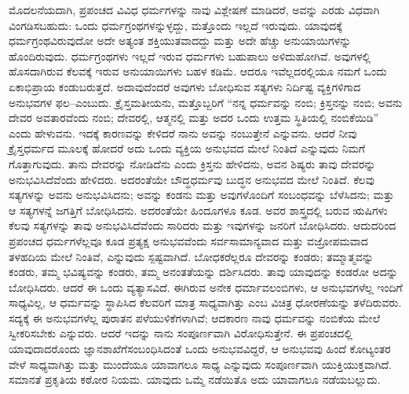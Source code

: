 \vskip 0.5cm

ಮೊದಲನೆಯದಾಗಿ, ಪ್ರಪಂಚದ ವಿವಿಧ ಧರ್ಮಗಳನ್ನು ನಾವು ವಿಶ್ಲೇಷಣೆ ಮಾಡಿದರೆ, ಅವನ್ನು ಎರಡು ವಿಧವಾಗಿ ವಿಂಗಡಿಸಬಹುದು: ಒಂದು ಧರ್ಮಗ್ರಂಥಗಳನ್ನುಳ್ಳದ್ದು, ಮತ್ತೊಂದು ಇಲ್ಲದೆ ಇರುವುದು. ಯಾವುದಕ್ಕೆ ಧರ್ಮಗ್ರಂಥವಿರುವುದೋ ಅದೇ ಅತ್ಯಂತ ಶಕ್ತಿಯುತವಾದದ್ದು ಮತ್ತು ಅದೇ ಹೆಚ್ಚು ಅನುಯಾಯಿಗಳನ್ನು ಹೊಂದಿರುವುದು. ಧರ್ಮಗ್ರಂಥಗಳು ಇಲ್ಲದೆ ಇರುವ ಧರ್ಮಗಳು ಬಹುಪಾಲು ಅಳಿದುಹೋಗಿವೆ. ಅವುಗಳಲ್ಲಿ ಹೊಸದಾಗಿರುವ ಕೆಲವಕ್ಕೆ ಇರುವ ಅನುಯಾಯಿಗಳು ಬಹಳ ಕಡಿಮೆ. ಆದರೂ ಇವೆಲ್ಲದರಲ್ಲಿಯೂ ನಮಗೆ ಒಂದು ಏಕಾಭಿಪ್ರಾಯ ಕಂಡುಬರುತ್ತದೆ. ಅದಾವುದೆಂದರೆ ಅವುಗಳು ಬೋಧಿಸುವ ಸತ್ಯಗಳು ನಿರ್ದಿಷ್ಟ ವ್ಯಕ್ತಿಗಳಿಗಾದ ಅನುಭವಗಳ ಫಲ–ಎಂಬುದು. ಕ್ರೈಸ್ತಮತೀಯನು, ಮತ್ತೊಬ್ಬರಿಗೆ “ನನ್ನ ಧರ್ಮವನ್ನು ನಂಬಿ; ಕ್ರಿಸ್ತನನ್ನು ನಂಬಿ; ಅವನು ದೇವರ ಅವತಾರವೆಂದು ನಂಬಿ; ದೇವರಲ್ಲಿ, ಆತ್ಮನಲ್ಲಿ ಮತ್ತು ಅದರ ಒಂದು ಉತ್ತಮ ಸ್ಥಿತಿಯಲ್ಲಿ ನಂಬಿಕೆಯಿಡಿ” ಎಂದು ಹೇಳುವನು. ಇದಕ್ಕೆ ಕಾರಣವನ್ನು ಕೇಳಿದರೆ ನಾನು ಅವನ್ನು ನಂಬುತ್ತೇನೆ ಎನ್ನುವನು. ಆದರೆ ನೀವು ಕ್ರೈಸ್ತಧರ್ಮದ ಮೂಲಕ್ಕೆ ಹೋದರೆ ಅದು ಒಂದು ವ್ಯಕ್ತಿಯ ಅನುಭವದ ಮೇಲೆ ನಿಂತಿದೆ ಎನ್ನುವುದು ನಿಮಗೆ ಗೊತ್ತಾಗುವುದು. ತಾನು ದೇವರನ್ನು ನೋಡಿದೆನು ಎಂದು ಕ್ರಿಸ್ತನು ಹೇಳಿದನು, ಅವನ ಶಿಷ್ಯರು ತಾವು ದೇವರನ್ನು ಅನುಭವಿಸಿದೆವೆಂದು ಹೇಳಿದರು. ಅದರಂತೆಯೇ ಬೌದ್ಧಧರ್ಮವು ಬುದ್ಧನ ಅನುಭವದ ಮೇಲೆ ನಿಂತಿದೆ. ಕೆಲವು ಸತ್ಯಗಳನ್ನು ಅವನು ಅನುಭವಿಸಿದನು; ಅವನ್ನು ಕಂಡನು ಮತ್ತು ಅವುಗಳೊಂದಿಗೆ ಸಂಬಂಧವನ್ನು ಬೆಳೆಸಿದನು; ಮತ್ತು ಆ ಸತ್ಯಗಳನ್ನೆ ಜಗತ್ತಿಗೆ ಬೋಧಿಸಿದನು. ಅದರಂತೆಯೇ ಹಿಂದೂಗಳೂ ಕೂಡ. ಅವರ ಶಾಸ್ತ್ರದಲ್ಲಿ ಬರುವ ಋಷಿಗಳು ಕೆಲವು ಸತ್ಯಗಳನ್ನು ತಾವು ಅನುಭವಿಸಿದೆವೆಂದು ಸಾರಿದರು ಮತ್ತು ಇವುಗಳನ್ನು ಜನರಿಗೆ ಬೋಧಿಸಿದರು. ಆದುದರಿಂದ ಪ್ರಪಂಚದ ಧರ್ಮಗಳೆಲ್ಲವೂ ಕೂಡ ಪ್ರತ್ಯಕ್ಷ ಅನುಭವವೆಂದು ಸರ್ವಸಾಮಾನ್ಯವಾದ ಮತ್ತು ವಜ್ರೋಪಮವಾದ ತಳಹದಿಯ ಮೇಲೆ ನಿಂತಿವೆ, ಎನ್ನುವುದು ಸ್ಪಷ್ಟವಾಗಿದೆ. ಬೋಧಕರೆಲ್ಲರೂ ದೇವರನ್ನು ಕಂಡರು; ತಮ್ಮಾತ್ಮವನ್ನು ಕಂಡರು, ತಮ್ಮ ಭವಿಷ್ಯವನ್ನು ಕಂಡರು, ತಮ್ಮ ಅನಂತತೆಯನ್ನು ದರ್ಶಿಸಿದರು. ತಾವು ಯಾವುದನ್ನು ಕಂಡರೋ ಅದನ್ನು ಬೋಧಿಸಿದರು. ಆದರೆ ಈ ಒಂದು ವ್ಯತ್ಯಾಸವಿದೆ. ಈಗಿರುವ ಅನೇಕ ಧರ್ಮಾವಲಂಬಿಗಳು, ಆ ಅನುಭವಗಳೆಲ್ಲ ಇಂದಿಗೆ ಸಾಧ್ಯವಿಲ್ಲ, ಆ ಧರ್ಮವನ್ನು ಸ್ಥಾಪಿಸಿದ ಕೆಲವರಿಗೆ ಮಾತ್ರ ಸಾಧ್ಯವಾಗಿತ್ತು ಎಂಬ ವಿಚಿತ್ರ ಧೋರಣೆಯನ್ನು ತಳೆದಿರುವರು. ಸದ್ಯಕ್ಕೆ ಈ ಅನುಭವಗಳೆಲ್ಲ ಪುರಾತನ ಪಳೆಯುಳಿಕೆಗಳಾಗಿವೆ; ಆದಕಾರಣ ನಾವು ಧರ್ಮವನ್ನು ನಂಬಿಕೆಯ ಮೇಲೆ ಸ್ವೀಕರಿಸಬೇಕು ಎನ್ನುವರು. ಆದರೆ ಇದನ್ನು ನಾನು ಸಂಪೂರ್ಣ\break ವಾಗಿ ವಿರೋಧಿಸುತ್ತೇನೆ. ಈ ಪ್ರಪಂಚದಲ್ಲಿ ಯಾವುದಾದರೊಂದು ಜ್ಞಾನಶಾಖೆಗೆ\break ಸಂಬಂಧಿಸಿದಂತೆ ಒಂದು ಅನುಭವವಿದ್ದರೆ, ಆ ಅನುಭವವು ಹಿಂದೆ ಕೋಟ್ಯಂತರ ವೇಳೆ ಸಾಧ್ಯವಾಗಿತ್ತು ಮತ್ತು ಮುಂದೆಯೂ ಯಾವಾಗಲೂ ಸಾಧ್ಯ ಎನ್ನುವುದು ಸಂಪೂರ್ಣವಾಗಿ ಯುಕ್ತಿಯುಕ್ತವಾಗಿದೆ. ಸಮಾನತೆ ಪ್ರಕೃತಿಯ ಕಠೋರ ನಿಯಮ. ಯಾವುದು ಒಮ್ಮೆ ನಡೆಯಿತೊ ಅದು ಯಾವಾಗಲೂ ನಡೆಯಬಲ್ಲುದು. 

\vskip 0.5cm


